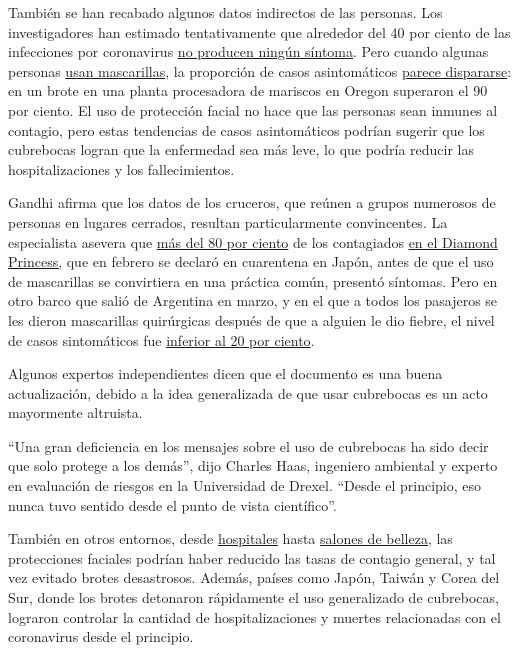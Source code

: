 También se han recabado algunos datos indirectos de las personas. Los
investigadores han estimado tentativamente que alrededor del 40 por
ciento de las infecciones por coronavirus
\href{https://www.cdc.gov/coronavirus/2019-ncov/hcp/planning-scenarios.html}{no
producen ningún síntoma}. Pero cuando algunas personas
\href{https://www.oregonlive.com/coronavirus/2020/06/big-coronavirus-outbreak-at-newport-seafood-plants-is-contained-health-authorities-say.html}{usan
mascarillas}, la proporción de casos asintomáticos
\href{https://apnews.com/4b9d38f206db9ce5267a5898ac24f238}{parece
dispararse}: en un brote en una planta procesadora de mariscos en Oregon
superaron el 90 por ciento. El uso de protección facial no hace que las
personas sean inmunes al contagio, pero estas tendencias de casos
asintomáticos podrían sugerir que los cubrebocas logran que la
enfermedad sea más leve, lo que podría reducir las hospitalizaciones y
los fallecimientos.

Gandhi afirma que los datos de los cruceros, que reúnen a grupos
numerosos de personas en lugares cerrados, resultan particularmente
convincentes. La especialista asevera que
\href{https://www.ncbi.nlm.nih.gov/pmc/articles/PMC7078829/}{más del 80
por ciento} de los contagiados
\href{https://www.nytimes.com/es/2020/03/10/espanol/mundo/coronavirus-crucero.html}{en
el Diamond Princess,} que en febrero se declaró en cuarentena en Japón,
antes de que el uso de mascarillas se convirtiera en una práctica común,
presentó síntomas. Pero en otro barco que salió de Argentina en marzo, y
en el que a todos los pasajeros se les dieron mascarillas quirúrgicas
después de que a alguien le dio fiebre, el nivel de casos sintomáticos
fue \href{https://thorax.bmj.com/content/75/8/693}{inferior al 20 por
ciento}.

Algunos expertos independientes dicen que el documento es una buena
actualización, debido a la idea generalizada de que usar cubrebocas es
un acto mayormente altruista.

``Una gran deficiencia en los mensajes sobre el uso de cubrebocas ha
sido decir que solo protege a los demás'', dijo Charles Haas, ingeniero
ambiental y experto en evaluación de riesgos en la Universidad de
Drexel. ``Desde el principio, eso nunca tuvo sentido desde el punto de
vista científico''.

También en otros entornos, desde
\href{https://jamanetwork.com/journals/jama/fullarticle/2768533}{hospitales}
hasta
\href{https://www.nytimes.com/2020/07/14/health/coronavirus-hair-salon-masks.html}{salones
de belleza}, las protecciones faciales podrían haber reducido las tasas
de contagio general, y tal vez evitado brotes desastrosos. Además,
países como Japón, Taiwán y Corea del Sur, donde los brotes detonaron
rápidamente el uso generalizado de cubrebocas, lograron controlar la
cantidad de hospitalizaciones y muertes relacionadas con el coronavirus
desde el principio.

